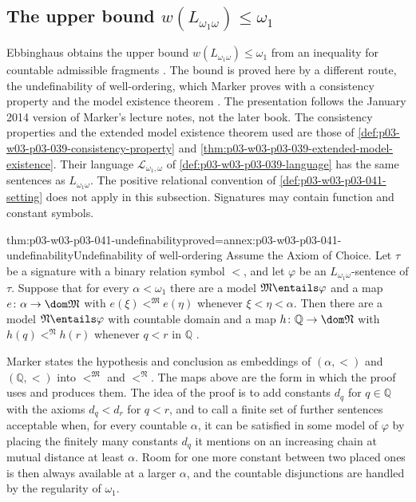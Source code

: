 \subsection{The upper bound \texorpdfstring{\(w(L_{\omega_1\omega})\leq\omega_1\)}{w(L omega1 omega) <= omega1}}
\label{sec:p03-w03-p03-041-upper-bound}

Ebbinghaus obtains the upper bound \(w(L_{\omega_1\omega})\leq\omega_1\)
from an inequality for countable admissible fragments
\cite[Ch.~II, Example~5.2.3(c), p.~62]{Ebbinghaus1985ExtendedLogics}.
The bound is proved here by a different route, the undefinability of
well-ordering, which Marker proves with a consistency property and the
model existence theorem
\cite[\S4.4, Theorem~4.27 and Corollary~4.28, pp.~51--53]{Marker2014InfinitaryNotes}.
The presentation follows the January 2014 version of Marker's lecture
notes, not the later book. The consistency properties and the extended
model existence theorem used are those of
\cref{def:p03-w03-p03-039-consistency-property} and
\cref{thm:p03-w03-p03-039-extended-model-existence}. Their language
\(\mathcal L_{\omega_1,\omega}\) of \cref{def:p03-w03-p03-039-language}
has the same sentences as \(L_{\omega_1\omega}\). The positive relational
convention of \cref{def:p03-w03-p03-041-setting} does not apply in this
subsection. Signatures may contain function and constant symbols.

\begin{hbtheorem}{thm:p03-w03-p03-041-undefinability}{proved=annex:p03-w03-p03-041-undefinability}{Undefinability of well-ordering}
Assume the Axiom of Choice. Let \(\tau\) be a signature with a binary
relation symbol \(<\), and let \(\varphi\) be an
\(L_{\omega_1\omega}\)-sentence of \(\tau\). Suppose that for every
\(\alpha<\omega_1\) there are a model \(\mathfrak M\entails\varphi\) and a
map \(e\colon\alpha\to\dom\mathfrak M\) with
\(e(\xi)<^{\mathfrak M}e(\eta)\) whenever \(\xi<\eta<\alpha\). Then there
are a model \(\mathfrak N\entails\varphi\) with countable domain and a
map \(h\colon\mathbb Q\to\dom\mathfrak N\) with
\(h(q)<^{\mathfrak N}h(r)\) whenever \(q<r\) in \(\mathbb Q\)
\cite[Theorem~4.27, p.~51]{Marker2014InfinitaryNotes}.
\end{hbtheorem}

Marker states the hypothesis and conclusion as embeddings of
\((\alpha,<)\) and \((\mathbb Q,<)\) into \(<^{\mathfrak M}\) and
\(<^{\mathfrak N}\). The maps above are the form in which the proof uses
and produces them. The idea of the proof is to add constants
\(d_q\) for \(q\in\mathbb Q\) with the axioms \(d_q<d_r\) for \(q<r\),
and to call a finite set of further sentences acceptable when, for every
countable \(\alpha\), it can be satisfied in some model of \(\varphi\) by
placing the finitely many constants \(d_q\) it mentions on an increasing
chain at mutual distance at least \(\alpha\). Room for one more constant
between two placed ones is then always available at a larger \(\alpha\),
and the countable disjunctions are handled by the regularity of
\(\omega_1\).

